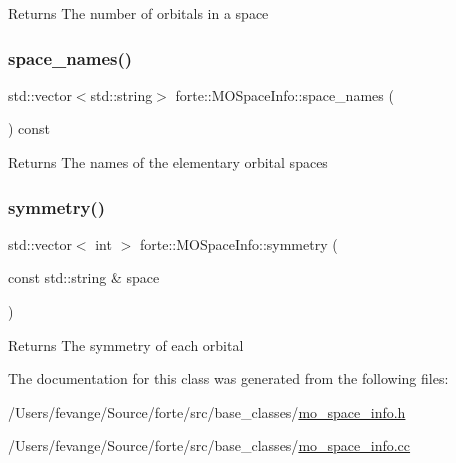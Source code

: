 \begin{DoxyReturn}{Returns}
The number of orbitals in a space 
\end{DoxyReturn}
\mbox{\label{classforte_1_1_m_o_space_info_a4b76861f449b11c9847efcc28c2e0c1b}} 
\subsubsection{\texorpdfstring{space\+\_\+names()}{space\_names()}}
{\footnotesize\ttfamily std\+::vector$<$std\+::string$>$ forte\+::\+M\+O\+Space\+Info\+::space\+\_\+names (\begin{DoxyParamCaption}{ }\end{DoxyParamCaption}) const\hspace{0.3cm}{\ttfamily [inline]}}

\begin{DoxyReturn}{Returns}
The names of the elementary orbital spaces 
\end{DoxyReturn}
\mbox{\label{classforte_1_1_m_o_space_info_a8756f0a82f1d3dcd3db3b11fb52a80fc}} 
\subsubsection{\texorpdfstring{symmetry()}{symmetry()}}
{\footnotesize\ttfamily std\+::vector$<$ int $>$ forte\+::\+M\+O\+Space\+Info\+::symmetry (\begin{DoxyParamCaption}\item[{const std\+::string \&}]{space }\end{DoxyParamCaption})}

\begin{DoxyReturn}{Returns}
The symmetry of each orbital 
\end{DoxyReturn}


The documentation for this class was generated from the following files\+:\begin{DoxyCompactItemize}
\item 
/\+Users/fevange/\+Source/forte/src/base\+\_\+classes/\mbox{\hyperlink{mo__space__info_8h}{mo\+\_\+space\+\_\+info.\+h}}\item 
/\+Users/fevange/\+Source/forte/src/base\+\_\+classes/\mbox{\hyperlink{mo__space__info_8cc}{mo\+\_\+space\+\_\+info.\+cc}}\end{DoxyCompactItemize}
